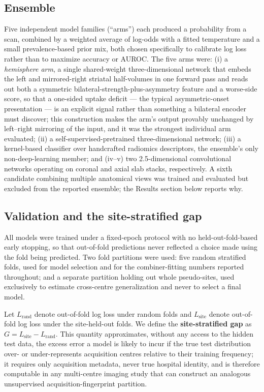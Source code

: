 \documentclass[11pt]{article}
\newcommand{\shiftgap}{\ensuremath{G}}
\newcommand{\lrand}{\ensuremath{L_{\text{rand}}}}
\newcommand{\lsite}{\ensuremath{L_{\text{site}}}}
\begin{document}
\subsection*{Ensemble}

Five independent model families (``arms'') each produced a probability from a scan, combined by a weighted average of log-odds with a fitted temperature and a small prevalence-based prior mix, both chosen specifically to calibrate log loss rather than to maximize accuracy or AUROC. The five arms were: (i) a \emph{hemisphere arm}, a single shared-weight three-dimensional network that embeds the left and mirrored-right striatal half-volumes in one forward pass and reads out both a symmetric bilateral-strength-plus-asymmetry feature and a worse-side score, so that a one-sided uptake deficit --- the typical asymmetric-onset presentation --- is an explicit signal rather than something a bilateral encoder must discover; this construction makes the arm's output provably unchanged by left--right mirroring of the input, and it was the strongest individual arm evaluated; (ii) a self-supervised-pretrained three-dimensional network; (iii) a kernel-based classifier over handcrafted radiomics descriptors, the ensemble's only non-deep-learning member; and (iv--v) two 2.5-dimensional convolutional networks operating on coronal and axial slab stacks, respectively. A sixth candidate combining multiple anatomical views was trained and evaluated but excluded from the reported ensemble; the Results section below reports why.

\subsection*{Validation and the site-stratified gap}

All models were trained under a fixed-epoch protocol with no held-out-fold-based early stopping, so that out-of-fold predictions never reflected a choice made using the fold being predicted. Two fold partitions were used: five random stratified folds, used for model selection and for the combiner-fitting numbers reported throughout; and a separate partition holding out whole pseudo-sites, used exclusively to estimate cross-centre generalization and never to select a final model.

Let \lrand{} denote out-of-fold log loss under random folds and \lsite{} denote out-of-fold log loss under the site-held-out folds. We define the \textbf{site-stratified gap} as $\shiftgap = \lsite - \lrand$. This quantity approximates, without any access to the hidden test data, the excess error a model is likely to incur if the true test distribution over- or under-represents acquisition centres relative to their training frequency; it requires only acquisition metadata, never true hospital identity, and is therefore computable in any multi-centre imaging study that can construct an analogous unsupervised acquisition-fingerprint partition.
\end{document}
